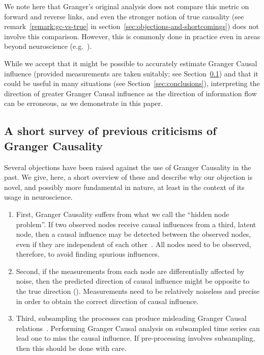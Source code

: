 \documentclass[letterpaper, 10pt, conference]{ieeeconf}
\begin{document}
We note here that Granger's original analysis does not compare this metric on forward and reverse links, and even the stronger notion of true causality (see remark~\ref{remark:gc-vs-true} in section~\ref{sec:objections-and-shortcomings}) does not involve this comparison. However, this is commonly done in practice even in areas beyond neuroscience (e.g.~\cite{Brovelli2004BetaOscillations,jiao2013universal}).

While we accept that it might be possible to accurately estimate Granger Causal influence (provided measurements are taken suitably; see Section~\ref{sec:previous-criticisms-of-gc}) and that it could be useful in many situations (see Section~\ref{sec:conclusions}), interpreting the direction of greater Granger Causal influence as the direction of information flow can be erroneous, as we demonstrate in this paper.


\subsection{A short survey of previous criticisms of Granger Causality}
\label{sec:previous-criticisms-of-gc}

Several objections have been raised against the use of Granger Causality in the past. We give, here, a short overview of these and describe why our objection is novel, and possibly more fundamental in nature, at least in the context of its usage in neuroscience.

\begin{enumerate}
	\item First, Granger Causality suffers from what we call the ``hidden node problem''. If two observed nodes receive causal influences from a third, latent node, then a causal influence may be detected between the observed nodes, even if they are independent of each other~\cite{pearl2009causality-hidden-node}. All nodes need to be observed, therefore, to avoid finding spurious influences.
	\item Second, if the measurements from each node are differentially affected by noise, then the predicted direction of causal influence might be opposite to the true direction (\cite{nalatore2007mitigating,andersson2005testing}). Measurements need to be relatively noiseless and precise in order to obtain the correct direction of causal influence.
	\item Third, subsampling the processes can produce misleading Granger Causal relations~\cite{gong2015discovering}. Performing Granger Causal analysis on subsampled time series can lead one to miss the causal influence. If pre-processing involves subsampling, then this should be done with care.
\end{enumerate}
\end{document}
